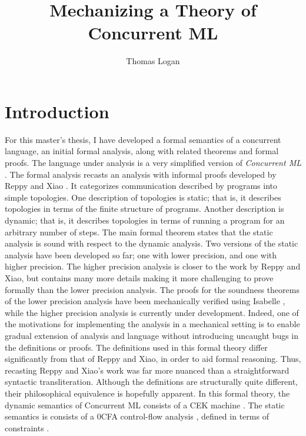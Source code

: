 \documentclass[10pt]{article}
\title{Mechanizing a Theory of Concurrent ML}
\author{Thomas Logan}
\begin{document}
\maketitle
{}

\newpage
{}


\section{Introduction}
For this master's thesis, I have developed a formal semantics of
a concurrent language, an initial formal analysis, along with related theorems and formal 
proofs. The language under analysis is
a very simplified version of \textit{Concurrent ML} \cite{reppy2007concurrent}. The formal analysis
recasts an analysis with informal proofs developed by Reppy and Xiao \cite{reppy2007specialization}. It
categorizes communication described by programs into simple topologies. One description of
topologies is static; that is, it describes topologies in terms of the finite structure of
programs.  Another description is dynamic; that is, it describes topologies in terms of running
a program for an arbitrary number of steps. The main formal theorem states that the static
analysis is sound with respect to the dynamic analysis. Two versions of the static analysis
have been developed so far; one with lower precision, and one with higher precision. The higher
precision analysis is closer to the work by Reppy and Xiao, but contains many more details making
it more challenging to prove formally than the lower precision analysis.
The proofs for the soundness theorems of the lower precision analysis
have been mechanically verified using Isabelle \cite{nipkow2002isabelle}, while the higher precision
analysis is currently under development. Indeed, one of the motivations for implementing the analysis 
in a mechanical setting is to enable gradual extension of analysis and language without introducing
uncaught bugs in the definitions or proofs. The definitions used in this formal theory differ
significantly from that of Reppy and Xiao, in order to aid formal reasoning. Thus, recasting
Reppy and Xiao's work was far more nuanced than a straightforward
syntactic transliteration.
Although the definitions are structurally quite different,
their philosophical equivalence is hopefully apparent. 
In this formal theory, the dynamic semantics of Concurrent ML consists of 
a CEK machine \cite{felleisen1986control}. The static semantics is consists of a 0CFA control-flow analysis
\cite{shivers1991control}, defined in terms of constraints \cite{nielson2015principles}.
\end{document}
